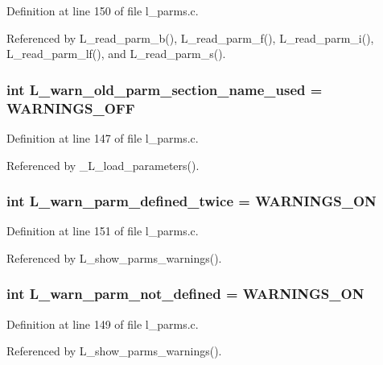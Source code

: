 Definition at line 150 of file l\_\-parms.c.

Referenced by L\_\-read\_\-parm\_\-b(), L\_\-read\_\-parm\_\-f(), L\_\-read\_\-parm\_\-i(), L\_\-read\_\-parm\_\-lf(), and L\_\-read\_\-parm\_\-s().
\subsubsection{\setlength{\rightskip}{0pt plus 5cm}int \bf{L\_\-warn\_\-old\_\-parm\_\-section\_\-name\_\-used} = WARNINGS\_\-OFF}\label{l__parms_8c_a6c1f01f3f17239261b3d73364478201}




Definition at line 147 of file l\_\-parms.c.

Referenced by \_\-L\_\-load\_\-parameters().
\subsubsection{\setlength{\rightskip}{0pt plus 5cm}int \bf{L\_\-warn\_\-parm\_\-defined\_\-twice} = WARNINGS\_\-ON}\label{l__parms_8c_ecc63b1ae2816e4e5b67830cefcc725b}




Definition at line 151 of file l\_\-parms.c.

Referenced by L\_\-show\_\-parms\_\-warnings().
\subsubsection{\setlength{\rightskip}{0pt plus 5cm}int \bf{L\_\-warn\_\-parm\_\-not\_\-defined} = WARNINGS\_\-ON}\label{l__parms_8c_3e945935cb7d3ea887b8309a40b01ea8}




Definition at line 149 of file l\_\-parms.c.

Referenced by L\_\-show\_\-parms\_\-warnings().
